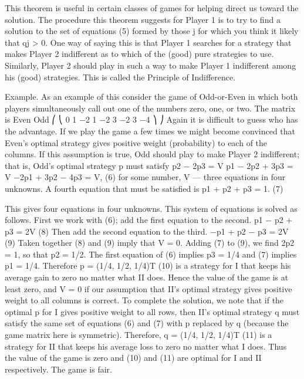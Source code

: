This theorem is useful in certain classes of games for helping direct us toward the
solution. The procedure this theorem suggests for Player 1 is to try to find a solution to
the set of equations (5) formed by those j for which you think it likely that qj > 0. One
way of saying this is that Player 1 searches for a strategy that makes Player 2 indifferent
as to which of the (good) pure strategies to use. Similarly, Player 2 should play in such a
way to make Player 1 indifferent among his (good) strategies. This is called the Principle
of Indifference.

Example. As an example of this consider the game of Odd-or-Even in which both
players simultaneously call out one of the numbers zero, one, or two. The matrix is
Even
Odd
⎛
⎝
0 1 −2
1 −2 3
−2 3 −4
⎞
⎠
Again it is difficult to guess who has the advantage. If we play the game a few times we
might become convinced that Even’s optimal strategy gives positive weight (probability)
to each of the columns. If this assumption is true, Odd should play to make Player 2
indifferent; that is, Odd’s optimal strategy p must satisfy
p2 − 2p3 = V
p1 − 2p2 + 3p3 = V
−2p1 + 3p2 − 4p3 = V,
(6)
for some number, V — three equations in four unknowns. A fourth equation that must be
satisfied is
p1 + p2 + p3 = 1. (7)

This gives four equations in four unknowns. This system of equations is solved as follows.
First we work with (6); add the first equation to the second.
p1 − p2 + p3 = 2V (8)
Then add the second equation to the third.
−p1 + p2 − p3 = 2V (9)
Taken together (8) and (9) imply that V = 0. Adding (7) to (9), we find 2p2 = 1, so that
p2 = 1/2. The first equation of (6) implies p3 = 1/4 and (7) implies p1 = 1/4. Therefore
p = (1/4, 1/2, 1/4)T (10)
is a strategy for I that keeps his average gain to zero no matter what II does. Hence the
value of the game is at least zero, and V = 0 if our assumption that II’s optimal strategy
gives positive weight to all columns is correct. To complete the solution, we note that if the
optimal p for I gives positive weight to all rows, then II’s optimal strategy q must satisfy
the same set of equations (6) and (7) with p replaced by q (because the game matrix here
is symmetric). Therefore,
q = (1/4, 1/2, 1/4)T (11)
is a strategy for II that keeps his average loss to zero no matter what I does. Thus the
value of the game is zero and (10) and (11) are optimal for I and II respectively. The game
is fair.
